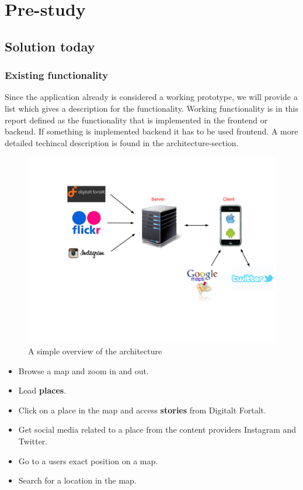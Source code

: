 \section{Pre-study}
	\subsection{Solution today}
		\subsubsection{Existing functionality}
Since the application already is considered a working prototype, we will provide a list which gives a description for the functionality. Working functionality is in this report defined as the functionality that is implemented in the frontend or backend. If something is implemented backend it has to be used frontend. A more detailed techincal description is found in the architecture-section.

\begin{figure}[h!]
\begin{center}
\includegraphics[scale=0.45]{ntoverview-architecture}
\caption{A simple overview of the architecture}
\end{center}
\end{figure}

\begin{itemize}
\item Browse a map and zoom in and out.
\item Load \textbf{places}.
\item Click on a place in the map and access \textbf{stories} from Digitalt Fortalt.
\item Get social media related to a place from the content providers Instagram and Twitter.
\item Go to a users exact position on a map.
\item Search for a location in the map.
\end{itemize}
	

